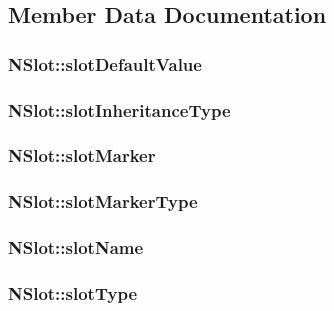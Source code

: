 \subsection{Member Data Documentation}
\hypertarget{class_n_slot_a3716484b8dfd3b31c9ecb630c85443d1}{
\subsubsection[{slotDefaultValue}]{ {\bf NSlot::slotDefaultValue}}}
\label{class_n_slot_a3716484b8dfd3b31c9ecb630c85443d1}
\hypertarget{class_n_slot_a2d8644e1143c59328da3446d23cba602}{
\subsubsection[{slotInheritanceType}]{ {\bf NSlot::slotInheritanceType}}}
\label{class_n_slot_a2d8644e1143c59328da3446d23cba602}
\hypertarget{class_n_slot_a0a27010311989dac227bd655c30d6c4f}{
\subsubsection[{slotMarker}]{ {\bf NSlot::slotMarker}}}
\label{class_n_slot_a0a27010311989dac227bd655c30d6c4f}
\hypertarget{class_n_slot_aa9ea2731c6fc5da11db78c71032dd837}{
\subsubsection[{slotMarkerType}]{ {\bf NSlot::slotMarkerType}}}
\label{class_n_slot_aa9ea2731c6fc5da11db78c71032dd837}
\hypertarget{class_n_slot_af2f9522fb7864dcd49453ce15650e93f}{
\subsubsection[{slotName}]{ {\bf NSlot::slotName}}}
\label{class_n_slot_af2f9522fb7864dcd49453ce15650e93f}
\hypertarget{class_n_slot_a69b4fe4aaf71d05ad0231fff910b1139}{
\subsubsection[{slotType}]{ {\bf NSlot::slotType}}}
\label{class_n_slot_a69b4fe4aaf71d05ad0231fff910b1139}


